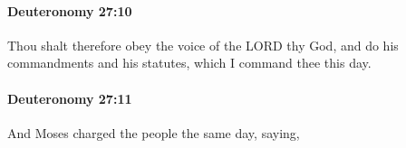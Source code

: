 		\paragraph{Deuteronomy 27:10} %
			\label{DEUTERONOMY-27-10}

			Thou shalt therefore obey the voice of the LORD thy God, and do his commandments and his statutes, which I command thee this day.


		\paragraph{Deuteronomy 27:11} %
			\label{DEUTERONOMY-27-11}

			And Moses charged the people the same day, saying,


